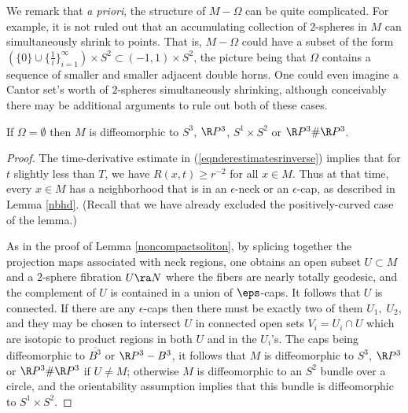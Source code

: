 We remark that {\it a priori}, the structure of $M - \Omega$ can be quite
complicated.  For example, it is not ruled out that an accumulating
collection of
$2$-spheres in $M$ can simultaneously shrink to points.
That is, $M - \Omega$ could have
a subset of the form $(\{ 0 \} \cup \{\frac{1}{i}\}_{i=1}^\infty )
\times S^2 \subset (-1, 1) \times S^2$, the picture being that
$\Omega$ contains a sequence of smaller and smaller adjacent double horns.
One could even imagine a
Cantor set's worth of $2$-spheres simultaneously shrinking, although conceivably
there may be additional arguments to rule out both of these cases.

\begin{lemma}
  \label{lem:kl-structure-at-first-singularity-time-rigidity-structure-at-first-singularity-time}
 \label{standard}
If $\Omega = \emptyset$ then $M$ is diffeomorphic
to $S^3$, $\R P^3$, $S^1 \times S^2$ or $\R P^3 \# \R P^3$.
\end{lemma}
\begin{proof}
The time-derivative estimate in (\ref{eqnderestimatesrinverse}) implies that
for $t$ slightly less than $T$, we have
$R(x,t) \ge r^{-2}$ for all
$x \in M$. Thus at that time, every $x \in M$ has a neighborhood that is in an
$\epsilon$-neck or an $\epsilon$-cap, as described in Lemma \ref{nbhd}.
(Recall that we have already excluded the positively-curved case of the lemma.)

As in the proof of Lemma \ref{noncompactsoliton}, by splicing together the projection
maps associated with neck regions, one obtains an open subset  $U\subset M$
and a $2$-sphere
fibration $U\ra N$ where the fibers are nearly totally geodesic, and the complement
of $U$  is contained in a union of $\eps$-caps.   It follows that $U$
is connected. If
 there are any $\epsilon$-caps then there must be exactly two of them $U_1,\;U_2$,
and they may be chosen to intersect $U$ in connected  open sets $V_i=U_i\cap U$
which are isotopic to product regions in both $U$ and in the $U_i$'s.
 The caps being diffeomorphic to $\overline{B^3}$ or
$\R P^3 - B^3$, it follows that $M$ is diffeomorphic to $S^3$, $\R P^3$ or $\R P^3
\# \R P^3$ if $U\neq M$; otherwise  $M$ is diffeomorphic to an $S^2$ bundle over a circle,
and the orientability assumption implies that this bundle is diffeomorphic
to $S^1\times S^2$.
\end{proof}

